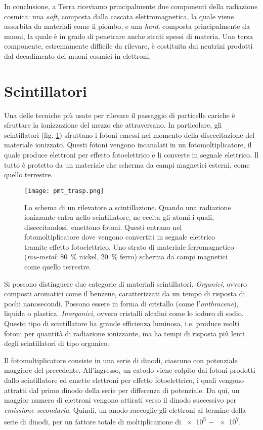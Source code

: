 \documentclass[../main.tex]{subfiles}
\begin{document}
In conclusione, a Terra riceviamo principalmente due componenti della radiazione cosmica: una \emph{soft}, composta dalla cascata elettromagnetica, la quale viene assorbita da materiali come il piombo, e una \emph{hard}, composta principalmente da muoni, la quale è in grado di penetrare anche strati spessi di materia. 
Una terza componente, estremamente difficile da rilevare, è costituita dai neutrini prodotti dal decadimento dei muoni cosmici in elettroni.

\section{Scintillatori}
Una delle tecniche più usate per rilevare il passaggio di particelle cariche è sfruttare la ionizzazione del mezzo che attraversano. In particolare, gli scintillatori (fig. \ref{fig:pmt}) sfruttano i fotoni emessi nel momento della diseccitazione del materiale ionizzato. Questi fotoni vengono incanalati in un fotomoltiplicatore, il quale produce elettroni per effetto fotoelettrico e li converte in segnale elettrico. Il tutto è protetto da un materiale che scherma da campi magnetici esterni, come quello terrestre.

\begin{figure}[!b]
    \centering
    \texttt{[image: pmt\_trasp.png]}
    \caption{Lo schema di un rilevatore a scintillazione. Quando una radiazione ionizzante entra nello scintillatore, ne eccita gli atomi i quali, diseccitandosi, emettono fotoni. Questi entrano nel fotomoltiplicatore dove vengono convertiti in segnale elettrico tramite effetto fotoelettrico. Uno strato di materiale ferromagnetico (\emph{mu-metal}: \SI{80}{\%} nickel, \SI{20}{\%} ferro) scherma da campi magnetici come quello terrestre.
    \cite{spurio}}
    \label{fig:pmt}
\end{figure}

Si possono distinguere due categorie di materiali scintillatori.
\emph{Organici}, ovvero composti aromatici come il benzene, caratterizzati da un tempo di risposta di pochi nanosecondi. Possono essere in forma di cristallo (come l'\emph{anthracene}), liquida o plastica. \emph{Inorganici}, ovvero cristalli alcalini come lo ioduro di sodio. Questo tipo di scintillatore ha grande efficienza luminosa, i.e. produce molti fotoni per quantità di radiazione ionizzante, ma ha tempi di risposta più lenti degli scintillatori di tipo organico.

Il fotomoltiplicatore consiste in una serie di dinodi, ciascuno con potenziale maggiore del precedente. All'ingresso, un catodo viene colpito dai fotoni prodotti dallo scintillatore ed emette elettroni per effetto fotoelettrico, i quali vengono attratti dal primo dinodo della serie per differenza di potenziale. Da qui, un maggior numero di elettroni vengono attirati verso il dinodo successivo per \emph{emissione secondaria}. Quindi, un anodo raccoglie gli elettroni al termine della serie di dinodi, per un fattore totale di moltiplicazione di \SI{e5}{} $-$ \SI{e7}{}.
\end{document}
